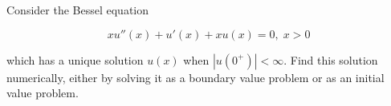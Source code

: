 Consider the Bessel equation

$$
x u''(x) + u'(x) + x u(x) = 0 ,\; x > 0
$$

which has a unique solution $u(x)$ when $|u(0^+)| < \infty$. Find this solution numerically, either by solving it as a
boundary value problem or as an initial value problem.

\begin{solution}\ \\\\
    \ \\
\end{solution}